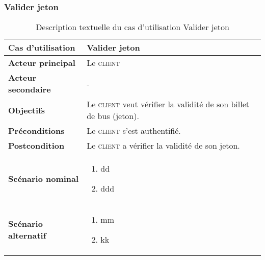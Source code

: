         \subsubsection[Scanner jeton]{Valider jeton}
        \begin{longtable}{p{4cm} p{9cm}}
            \caption{Description textuelle du cas d’utilisation Valider jeton}
            \label{table:usecaseScannerJ}
            \\\hline\hline
                \textbf{Cas d’utilisation} & \textbf{Valider jeton}
            \\\hline\hline
                    \textbf{Acteur principal} & Le \textsc{client}
                \\
                    \textbf{Acteur secondaire} & -
                \\
                    \textbf{Objectifs} & Le \textsc{client} veut vérifier la
                    validité de son billet de bus (jeton).
                \\
                    \textbf{Préconditions} & Le \textsc{client} s’est authentifié.
                \\
                    \textbf{Postcondition} & Le \textsc{client} a vérifier la validité de son jeton.
                \\
                \textbf{Scénario nominal} &
                    \begin{enumerate}[leftmargin=*]
                        \item dd
                        \item ddd
                    \end{enumerate}
                \\
                \textbf{Scénario alternatif} &
                    \begin{enumerate}[leftmargin=*]
                        \item mm
                        \item kk
                    \end{enumerate}
            \\\bottomrule
        \end{longtable}

